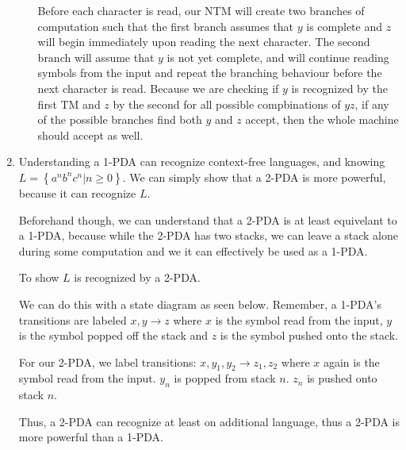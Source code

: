 \documentclass{article}
\newcommand{\set}[1]{{\left\{#1\right\}}}    %
\begin{document}
\begin{enumerate}
\begin{enumerate}
                Before each character is read, our NTM will create two branches of computation such that the first branch assumes that $y$ is complete and $z$ will begin immediately upon reading the next character.
                The second branch will assume that $y$ is not yet complete, and will continue reading symbols from the input and repeat the branching behaviour before the next character is read.
                Because we are checking if $y$ is recognized by the first TM and $z$ by the second for all possible compbinations of $yz$, if any of the possible branches find both $y$ and $z$ accept, then the whole machine should accept as well.
        \end{enumerate}
    \item %
        Understanding a 1-PDA can recognize context-free languages, and knowing $L = \set{a^nb^nc^n | n \ge 0}$. We can simply show that a 2-PDA is more powerful, because it can recognize $L$.

        Beforehand though, we can understand that a 2-PDA is at least equivelant to a 1-PDA, because while the 2-PDA has two stacks, we can leave a stack alone during some computation and we it can effectively be used as a 1-PDA.

        To show $L$ is recognized by a 2-PDA.

        We can do this with a state diagram as seen below.
        Remember, a 1-PDA's transitions are labeled $x, y \rightarrow z$ where $x$ is the symbol read from the input, $y$ is the symbol popped off the stack and $z$ is the symbol pushed onto the stack.

        For our 2-PDA, we label transitions: $x,y_1,y_2\rightarrow z_1,z_2$ where $x$ again is the symbol read from the input.
        $y_n$ is popped from stack $n$. $z_n$ is pushed onto stack $n$.


        Thus, a 2-PDA can recognize at least on additional language, thus a 2-PDA is more powerful than a 1-PDA.
\end{enumerate}
\end{document}
